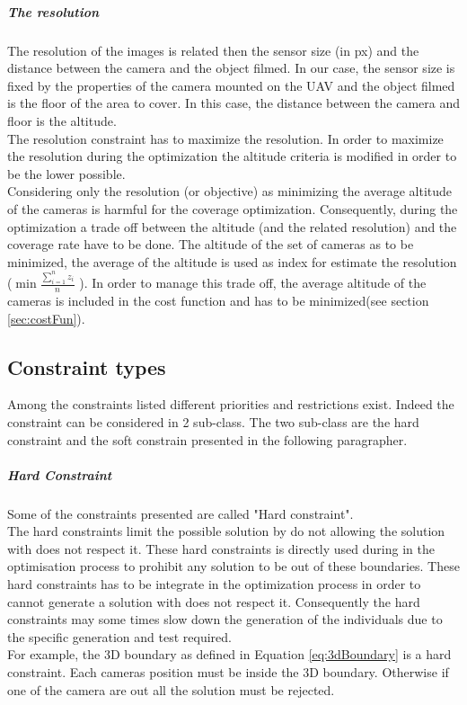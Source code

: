 \subparagraph{The resolution}
The resolution of the images is related then the sensor size (in px) and the distance between the camera and the object filmed. In our case, the sensor size is fixed by the properties of the camera mounted on the UAV and the object filmed is the floor of the area to cover. In this case, the distance between the camera and floor is the altitude. \\
The resolution constraint has to maximize the resolution. In order to maximize the resolution during the optimization the altitude criteria is modified in order to be the lower possible.\\
Considering only the resolution (or objective) as minimizing the average altitude of the cameras is harmful for the coverage optimization.
Consequently, during the optimization a trade off between the altitude (and the related resolution) and the coverage rate have to be done.
 The altitude of the set of cameras  as to be  minimized, the average of the altitude is used as index for estimate the resolution  ($\min{\frac{\sum^n_{i=1}{z_i}}{n}}$ ). In order to manage this trade off, the average altitude of the cameras is included in the cost function  and has to be minimized(see section  \ref{sec:costFun}).  \\
 
\subsection{Constraint types}
 
Among the constraints listed different priorities and restrictions exist. Indeed the constraint can be considered in 2 sub-class. The two sub-class are the hard constraint and the soft constrain  presented in the following paragrapher.

\subparagraph{Hard Constraint}
 Some of the constraints presented are called "Hard constraint". \\
 The hard constraints limit the possible solution by do not allowing the solution with does not respect it. These hard constraints is directly used during in the optimisation process to prohibit any solution to be out of these boundaries. These hard constraints has to be integrate in the optimization process in order to cannot generate a solution with does not respect it. Consequently the hard constraints may some times slow down the generation of the individuals due to the specific generation and test required.\\ 
 For example, the 3D boundary as defined in Equation \ref{eq:3dBoundary} is a hard constraint. Each cameras position must be inside the 3D boundary. Otherwise  if one of the camera are out all the solution must be rejected. \\
 
